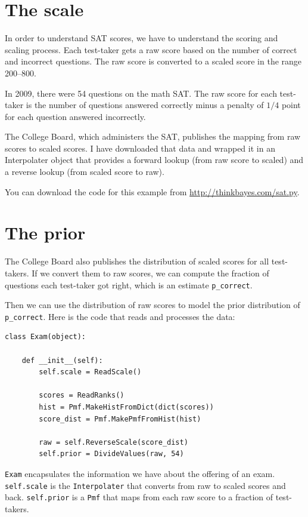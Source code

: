 \documentclass[12pt]{book}
\begin{document}
\section{The scale}

In order to understand SAT scores, we have to understand the scoring
and scaling process.  Each test-taker gets a raw score based on the
number of correct and incorrect questions.  The raw score is converted
to a scaled score in the range 200--800.

In 2009, there were 54 questions on the math SAT.  The raw score
for each test-taker is the number of questions answered correctly
minus a penalty of $1/4$ point for each question answered incorrectly.

The College Board, which administers the SAT, publishes the
mapping from raw scores to scaled scores.  I have downloaded that
data and wrapped it in an Interpolater object that provides a forward
lookup (from raw score to scaled) and a reverse lookup (from scaled
score to raw).

You can download the code for this example from
\url{http://thinkbayes.com/sat.py}.


\section{The prior}

The College Board also publishes the distribution of scaled scores
for all test-takers.  If we convert them to raw scores, we can
compute the fraction of questions each test-taker got right, which
is an estimate \verb"p_correct".

Then we can use the distribution of raw scores to model the
prior distribution of \verb"p_correct".
Here is the code that reads and processes the data:

\begin{verbatim}
class Exam(object):

    def __init__(self):
        self.scale = ReadScale()

        scores = ReadRanks()
        hist = Pmf.MakeHistFromDict(dict(scores))
        score_dist = Pmf.MakePmfFromHist(hist)

        raw = self.ReverseScale(score_dist)
        self.prior = DivideValues(raw, 54)
\end{verbatim}

{\tt Exam} encapsulates the information we have about the offering
of an exam.  {\tt self.scale} is the {\tt Interpolater} that converts
from raw to scaled scores and back.  {\tt self.prior} is a {\tt Pmf}
that maps from each raw score to a fraction of test-takers.
\end{document}
